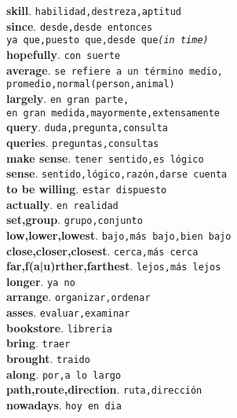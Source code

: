 \documentclass[twocolumn]{article}
\begin{document}
	\textsf{\textbf{skill}}. \texttt{habilidad,destreza,aptitud}\\
	\textsf{\textbf{since}}. \texttt{desde,desde entonces\\ya que,puesto que,desde que{\scriptsize \textsl{(in time)}}}\\
	\textsf{\textbf{hopefully}}. \texttt{con suerte}\\
	\textsf{\textbf{average}}. \texttt{se refiere a un t\'ermino medio,\\promedio,normal(person,animal)}\\
	\textsf{\textbf{largely}}. \texttt{en gran parte,\\en gran medida,mayormente,extensamente}\\
	\textsf{\textbf{query}}. \texttt{duda,pregunta,consulta}\\
	\textsf{\textbf{queries}}. \texttt{preguntas,consultas}\\
	\textsf{\textbf{make sense}}. \texttt{tener sentido,es l\'ogico}\\
	\textsf{\textbf{sense}}. \texttt{sentido,l\'ogico,raz\'on,darse cuenta}\\
	\textsf{\textbf{to be willing}}. \texttt{estar dispuesto}\\
	\textsf{\textbf{actually}}. \texttt{en realidad}\\
	\textsf{\textbf{set,group}}. \texttt{grupo,conjunto}\\
	\textsf{\textbf{low,lower,lowest}}. \texttt{bajo,m\'as bajo,bien bajo}\\
	\textsf{\textbf{close,closer,closest}}. \texttt{cerca,m\'as cerca}\\
	\textsf{\textbf{far,f(a|u)rther,farthest}}. \texttt{lejos,m\'as lejos}\\
	\textsf{\textbf{longer}}. \texttt{ya no}\\
	\textsf{\textbf{arrange}}. \texttt{organizar,ordenar}\\
	\textsf{\textbf{asses}}. \texttt{evaluar,examinar}\\
	\textsf{\textbf{bookstore}}. \texttt{libreria}\\
	\textsf{\textbf{bring}}. \texttt{traer}\\
	\textsf{\textbf{brought}}. \texttt{traido}\\
	\textsf{\textbf{along}}. \texttt{por,a lo largo}\\
	\textsf{\textbf{path,route,direction}}. \texttt{ruta,direcci\'on}\\
	\textsf{\textbf{nowadays}}. \texttt{hoy en dia}\\
\end{document}
